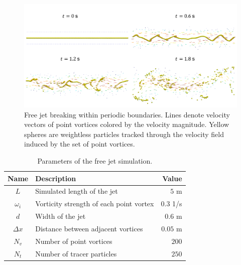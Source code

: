 \documentclass[a4paper,12pt,openany]{book}
\theoremstyle{break}
\begin{document}
\begin{figure}[H]
  \includegraphics[scale=0.6]{shear_result.pdf}
  \centering
  \caption{Free jet breaking within periodic boundaries. Lines denote velocity vectors of point vortices colored by the velocity magnitude. Yellow spheres are weightless particles tracked through the velocity field induced by the set of point vortices. }
  \label{fig:shear_result}
\end{figure}\vspace*{3pt}

\begin{table} [H]
\begin{center}
\caption{Parameters of the free jet simulation.}\label{tbl:shear_layer_values}
\begin{tabular}{ c l r } 
\toprule[1.5pt]
\bf Name & \bf Description & \bf Value \\
\midrule
$L$ & Simulated length of the jet & $5$ m \\
$\omega_i$ & Vorticity strength of each point vortex & $0.3$ 1/s \\
$d$ & Width of the jet & $0.6$ m \\
$\Delta x$ & Distance between adjacent vortices & $0.05$ m \\
$N_v$ & Number of point vortices & $200$ \\
$N_t$ & Number of tracer particles & $250$ \\
\bottomrule[1.25pt]
\end{tabular}
\end{center}
\end{table}
\end{document}
